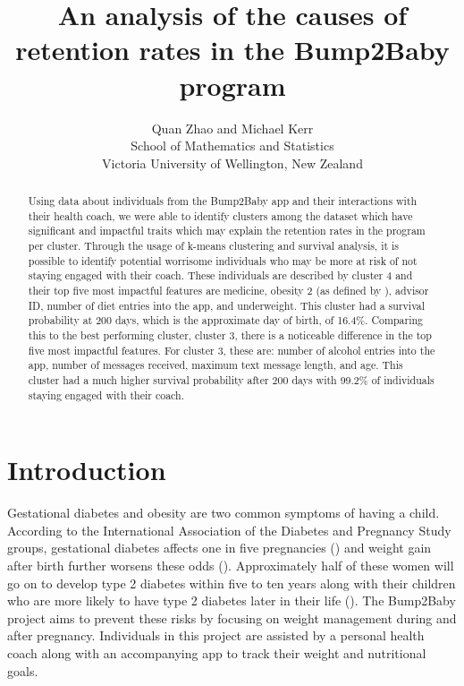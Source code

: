 \documentclass[12pt]{article}
\title{An analysis of the causes of retention rates in the Bump2Baby program}
\author{Quan Zhao and Michael Kerr\\
School of Mathematics and Statistics\\ Victoria University of Wellington, New Zealand}
\begin{document}
\maketitle

\begin{abstract}
  Using data about individuals from the Bump2Baby app and their interactions with their health coach, we were able to identify clusters among the dataset which have significant and impactful traits which may explain the retention rates in the program per cluster. Through the usage of k-means clustering and survival analysis, it is possible to identify potential worrisome individuals who may be more at risk of not staying engaged with their coach. These individuals are described by cluster 4 and their top five most impactful features are medicine, obesity 2 (as defined by \cite{WHO_BMI}), advisor ID, number of diet entries into the app, and underweight. This cluster had a survival probability at 200 days, which is the approximate day of birth, of 16.4\%. Comparing this to the best performing cluster, cluster 3, there is a noticeable difference in the top five most impactful features. For cluster 3, these are: number of alcohol entries into the app, number of messages received, maximum text message length, and age. This cluster had a much higher survival probability after 200 days with 99.2\% of individuals staying engaged with their coach.
\end{abstract}


\tableofcontents


\setlength{\baselineskip}{0.25in} %





\newpage  %
\section{Introduction}
		
		\label{s.intro}
		
		Gestational diabetes and obesity are two common symptoms of having a child. According to the International Association of the Diabetes and Pregnancy Study groups, gestational diabetes affects one in five pregnancies (\cite{10.2337/dc11-1641}) and weight gain after birth further worsens these odds (\cite{nu11040922}). Approximately half of these women will go on to develop type 2 diabetes within five to ten years along with their children who are more likely to have type 2 diabetes later in their life (\cite{Vounzoulakim1361}). The Bump2Baby project aims to prevent these risks by focusing on weight management during and after pregnancy. Individuals in this project are assisted by a personal health coach along with an accompanying app to track their weight and nutritional goals.
		
\end{document}
